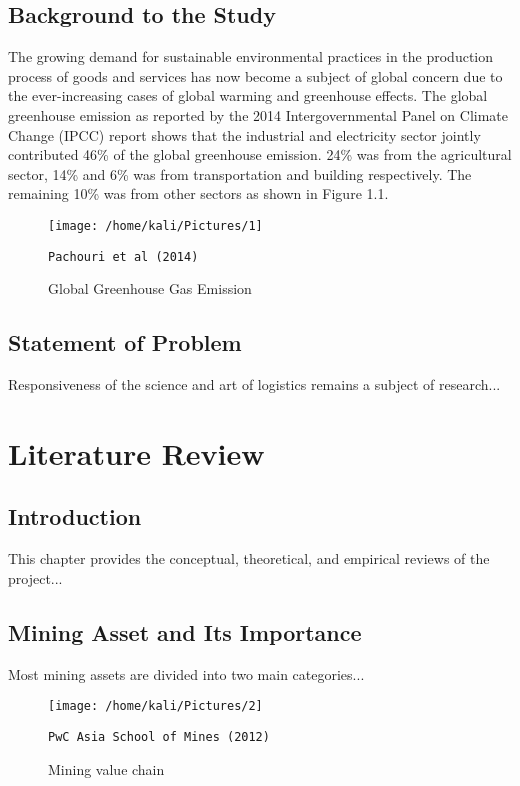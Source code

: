 \documentclass[12pt,a4paper]{report}
\begin{document}
	\section{Background to the Study}
	The growing demand for sustainable environmental practices in the production process of goods and services has now become a subject of global concern due to the ever-increasing cases of global warming and greenhouse effects. The global greenhouse emission as reported by the 2014 Intergovernmental Panel on Climate Change (IPCC) report shows that the industrial and electricity sector jointly contributed 46\% of the global greenhouse emission. 24\% was from the agricultural sector, 14\% and 6\% was from transportation and building respectively. The remaining 10\% was from other sectors as shown in Figure 1.1.

	\begin{figure}[h]
		\centering
		\texttt{[image: /home/kali/Pictures/1]}
		\caption{Global Greenhouse Gas Emission}
		\label{fig:greenhouse_emission}
		\texttt{Pachouri et al (2014)}
	\end{figure}

	\section{Statement of Problem}
	Responsiveness of the science and art of logistics remains a subject of research...


	\chapter{Literature Review}
	\section{Introduction}
	This chapter provides the conceptual, theoretical, and empirical reviews of the project...

	\section{Mining Asset and Its Importance}
	Most mining assets are divided into two main categories...

	\begin{figure}[h]
		\centering
		\texttt{[image: /home/kali/Pictures/2]}
		\caption{Mining value chain}
		\label{fig:mining_value_chain}
		\texttt{PwC Asia School of Mines (2012)}
	\end{figure}

\end{document}
